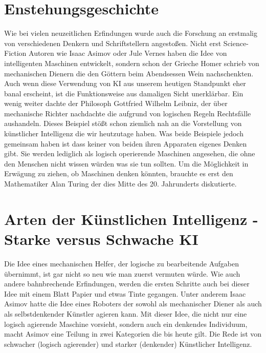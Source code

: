 \documentclass[12pt]{report}
\begin{document}
    \section{Enstehungsgeschichte}
    Wie bei vielen neuzeitlichen Erfindungen wurde auch die Forschung an 
    erstmalig von verschiedenen Denkern und Schriftstellern angestoßen.
    Nicht erst Science-Fiction Autoren wie Isaac Asimov oder Jule Vernes haben die Idee von intelligenten Maschinen
    entwickelt, sondern schon der Grieche Homer schrieb von mechanischen Dienern die den Göttern beim Abendsessen
    Wein nachschenkten.\cite{buchanan2005very} Auch wenn diese Verwendung von KI aus unserem heutigen Standpunkt
    eher banal erscheint, ist die Funktionsweise aus damaligen Sicht unerklärbar.
    Ein wenig weiter dachte der Philosoph Gottfried Wilhelm Leibniz, der über mechanische Richter nachdachte
    die aufgrund von logischen Regeln Rechtsfälle aushandeln.\cite{buchanan2005very}
    Dieses Beispiel stößt schon ziemlich nah an die Vorstellung von künstlicher Intelligenz die wir heutzutage haben.
    Was beide Beispiele jedoch gemeinsam haben ist dass keiner von beiden ihren Apparaten eigenes Denken
    gibt. Sie werden lediglich als logisch operierende Maschinen angesehen, die ohne den Menschen nicht wissen würden
    was sie tun sollten.
    Um die Möglichkeit in Erwägung zu ziehen, ob Maschinen denken könnten, brauchte es erst den Mathematiker Alan Turing
    der dies Mitte des 20. Jahrunderts diskutierte.\cite{sesink1993menschliche}


    \section{Arten der Künstlichen Intelligenz - Starke versus Schwache KI}
    Die Idee eines mechanischen Helfer, der logische zu bearbeitende Aufgaben übernimmt, ist gar nicht so neu wie man
    zuerst vermuten würde. Wie auch andere bahnbrechende Erfindungen, werden die ersten Schritte auch bei dieser Idee
    mit einem Blatt Papier und etwas Tinte gegangen. Unter anderem Isaac Asimov hatte die Idee
    eines Roboters der sowohl als mechanischer Diener als auch als selbstdenkender Künstler agieren kann.\cite{asimov2000der}
    Mit dieser Idee, die nicht nur eine logisch agierende Maschine vorsieht, sondern auch ein denkendes Individuum, macht Asimov
    eine Teilung in zwei Kategorien die bis heute gilt. Die Rede ist von schwacher (logisch agierender) und starker (denkender) Künstlicher Intelligenz.\\
\end{document}
